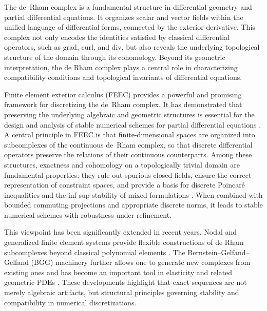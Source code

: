 \documentclass[pdflatex,sn-mathphys-num]{sn-jnl}
\numberwithin{equation}{section}
\numberwithin{theorem}{section}
\numberwithin{table}{section}
\numberwithin{figure}{section}
\begin{document}
The de~Rham complex is a fundamental structure in differential geometry and partial differential equations. It organizes scalar and vector fields within the unified language of differential forms, connected by the exterior derivative. This complex not only encodes the identities satisfied by classical differential operators, such as grad, curl, and div, but also reveals the underlying topological structure of the domain through its cohomology. Beyond its geometric interpretation, the de Rham complex plays a central role in characterizing compatibility conditions and topological invariants of differential equations.

Finite element exterior calculus (FEEC) provides a powerful and promising framework for discretizing the de~Rham complex. It has demonstrated that preserving the underlying algebraic and geometric structures is essential for the design and analysis of stable numerical schemes for partial differential equations \cite{arnold2006finite,arnold2010finite,arnold2018finite}.  A central principle in FEEC is that finite-dimensional spaces are organized into subcomplexes of the continuous de~Rham complex, so that discrete differential operators preserve the relations of their continuous counterparts.  Among these structures, exactness and cohomology on a topologically trivial domain are fundamental properties: they rule out spurious closed fields, ensure the correct representation of constraint spaces, and provide a basis for discrete Poincar\'e inequalities and the inf-sup stability of mixed formulations \cite{boffi2013mixed}.  When combined with bounded commuting projections and appropriate discrete norms, it leads to stable numerical schemes with robustness under refinement.

This viewpoint has been significantly extended in recent years.  Nodal and generalized finite element systems provide flexible constructions of de Rham subcomplexes beyond classical polynomial elements \cite{christiansen2018nodal,christiansen2018generalized}.  The Bernstein--Gelfand--Gelfand (BGG) machinery further allows one to generate new complexes from existing ones and has become an important tool in elasticity and related geometric PDEs \cite{cap2001bernstein,arnold2021complexes,cap2024bgg}.  These developments highlight that exact sequences are not merely algebraic artifacts, but structural principles governing stability and compatibility in numerical discretizations.
\end{document}
